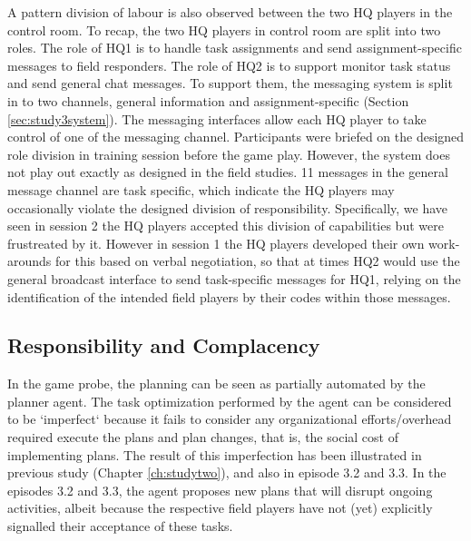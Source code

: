 A pattern division of labour is also observed between the two HQ players in the control room. To recap, the two HQ players in control room are split into two roles. The role of HQ1 is to handle task assignments and send assignment-specific messages to field responders. The role of HQ2 is to support monitor task status and send general chat messages. To support them, the messaging system  is split in to two channels, general information and assignment-specific (Section \ref{sec:study3system}). The messaging interfaces allow each HQ player to take control of one of the messaging channel. Participants were briefed on the designed role division in training session before the game play. However, the system does not play out exactly as designed in the field studies. 11 messages in the general message channel are task specific, which indicate the HQ players may occasionally violate the designed division of responsibility. Specifically, we have seen in session 2 the HQ players accepted this division of capabilities but were frustreated by it. However in session 1 the HQ players developed their own work-arounds for this based on verbal negotiation, so that at times HQ2 would use the general broadcast interface to send task-specific messages for HQ1, relying on the identification of the intended field players by their codes within those messages.


\subsection{Responsibility and Complacency}\label{sec:huilimperfection}
In the game probe, the planning can be seen as partially automated by the planner agent. The task optimization performed by the agent can be considered to be `imperfect` because it fails to consider any organizational efforts/overhead required execute the plans and plan changes, that is, the social cost of implementing plans. The result of this imperfection has been illustrated in previous study (Chapter \ref{ch:studytwo}), and also in episode 3.2 and 3.3. In the episodes 3.2 and 3.3, the agent proposes new plans that will disrupt ongoing activities, albeit because the respective field players have not (yet) explicitly signalled their acceptance of these tasks.\\

